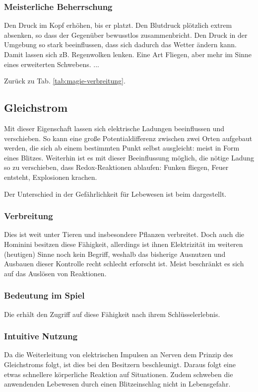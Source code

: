 \subsubsection{Meisterliche Beherrschung} 
\begin{outline}
	\1 Den Druck im Kopf erhöhen, bis er platzt.
	\1 Den Blutdruck plötzlich extrem absenken, so dass der Gegenüber bewusstlos zusammenbricht. 
	\1 Den Druck in der Umgebung so stark beeinflussen, dass sich dadurch das Wetter ändern kann. Damit lassen sich zB. Regenwolken lenken. 
	\1 Eine Art Fliegen, aber mehr im Sinne eines erweiterten Schwebens.
	\1 ...
\end{outline}
Zurück zu Tab. \ref{tab:magie-verbreitung}.



\subsection{Gleichstrom}\label{magie:gleichstrom}
Mit dieser Eigenschaft lassen sich elektrische Ladungen beeinflussen und verschieben.
So kann eine große Potentialdifferenz zwischen zwei Orten aufgebaut werden, die sich ab einem bestimmten Punkt selbst ausgleicht: meist in Form eines Blitzes.
Weiterhin ist es mit dieser Beeinflussung möglich, die nötige Ladung so zu verschieben, dass Redox-Reaktionen ablaufen: Funken fliegen, Feuer entsteht, Explosionen krachen.

Der Unterschied in der Gefährlichkeit für Lebewesen ist beim  dargestellt.

\subsubsection{Verbreitung}
Dies ist weit unter Tieren und insbesondere Pflanzen verbreitet. 
Doch auch die Hominini besitzen diese Fähigkeit, allerdings ist ihnen Elektrizität im weiteren (heutigen) Sinne noch kein Begriff, weshalb das bisherige Ausnutzen und Ausbauen dieser Kontrolle recht schlecht erforscht ist.
Meist beschränkt es sich auf das Auslösen von Reaktionen.

\subsubsection{Bedeutung im Spiel}
Die  erhält den Zugriff auf diese Fähigkeit nach ihrem Schlüsselerlebnis. 

\subsubsection{Intuitive Nutzung}
Da die Weiterleitung von elektrischen Impulsen an Nerven dem Prinzip des Gleichstroms folgt, ist dies bei den Besitzern beschleunigt.
Daraus folgt eine etwas schnellere körperliche Reaktion auf Situationen.
Zudem schweben die anwendenden Lebewesen durch einen Blitzeinschlag nicht in Lebensgefahr.  

